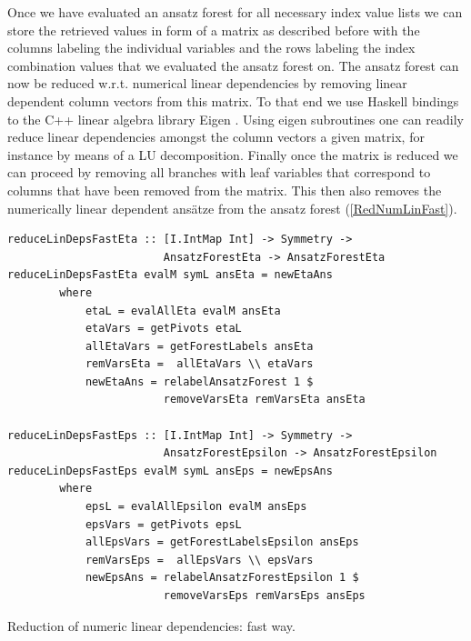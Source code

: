 \documentclass[a4paper,12pt, DIV=14, BCOR=5mm, twoside, headsepline, numbers=noenddot]{scrbook}
\begin{document}
Once we have evaluated an ansatz forest for all necessary index value lists we can store the retrieved values in form of a matrix as described before with the columns labeling the individual variables and the rows labeling the index combination values that we evaluated the ansatz forest on. The ansatz forest can now be reduced w.r.t. numerical linear dependencies by removing linear dependent column vectors from this matrix. To that end we use Haskell bindings \cite{HackageEigen} to the C++ linear algebra library Eigen \cite{eigenweb}. Using eigen subroutines one can readily reduce linear dependencies amongst the column vectors a given matrix, for instance by means of a LU decomposition. Finally once the matrix is reduced we can proceed by removing all branches with leaf variables that correspond to columns that have been removed from the matrix. This then also removes the numerically linear dependent ansätze from the ansatz forest (\ref{RedNumLinFast}).
\begin{listing}[hbt!]
\begin{verbatim}
reduceLinDepsFastEta :: [I.IntMap Int] -> Symmetry ->
                        AnsatzForestEta -> AnsatzForestEta
reduceLinDepsFastEta evalM symL ansEta = newEtaAns
        where
            etaL = evalAllEta evalM ansEta
            etaVars = getPivots etaL
            allEtaVars = getForestLabels ansEta
            remVarsEta =  allEtaVars \\ etaVars
            newEtaAns = relabelAnsatzForest 1 $
                        removeVarsEta remVarsEta ansEta

reduceLinDepsFastEps :: [I.IntMap Int] -> Symmetry ->
                        AnsatzForestEpsilon -> AnsatzForestEpsilon
reduceLinDepsFastEps evalM symL ansEps = newEpsAns
        where
            epsL = evalAllEpsilon evalM ansEps
            epsVars = getPivots epsL
            allEpsVars = getForestLabelsEpsilon ansEps
            remVarsEps =  allEpsVars \\ epsVars
            newEpsAns = relabelAnsatzForestEpsilon 1 $
                        removeVarsEps remVarsEps ansEps 
\end{verbatim} 
\caption{Reduction of numeric linear dependencies: fast way.}\label{RedNumLinFast}
\end{listing}\\
\end{document}
